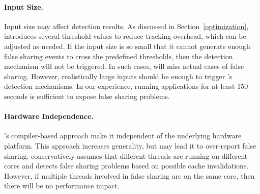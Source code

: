 \paragraph{Input Size.} Input size may affect detection results.  As discussed in Section~\ref{optimization}, \Predator{} introduces several threshold values to reduce tracking overhead, which can be adjusted as needed. If the input size is so small that it cannot generate enough false sharing events to cross the predefined thresholds, then the detection mechanism will not be triggered. In such cases, \Predator{} will miss actual cases of false sharing. However, realistically large inputs should be enough to trigger \Predator{}'s detection mechanisms. In our experience, running applications for at least 150 seconds is sufficient to expose false sharing problems. 

\paragraph{Hardware Independence.}  \Predator{}'s compiler-based approach make it independent of the underlying hardware platform. This approach increases generality, but may lead it to over-report false sharing. \Predator{} conservatively assumes that different threads are running on different cores and detects false sharing problems based on possible cache invalidations. However, if multiple threads involved in false sharing are on the same core, then there will be no performance impact. 

